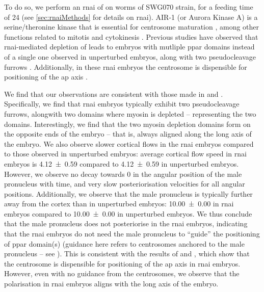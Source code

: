 To do so, we perform an \ac{rnai} of  on worms of SWG070 strain, for a feeding time of \SI{24}{\unitRNAiTime} (see \autoref{sec:rnaiMethods} for details on \ac{rnai}). AIR-1 (or Aurora Kinase A) is a serine/theronine kinase that is essential for centrosome maturation \citep{hannak2001aurora}, among other functions related to mitotis and cytokinesis \citep{kapoor2019centrosome}. Previous studies have observed that \ac{rnai}-mediated depletion of  leads to embryos with mutliple \ac{ppar} domains instead of a single one observed in unperturbed embryos, along with two pseudocleavage furrows \citep{kapoor2019centrosome,klinkert2019aurora}. Additionally, in these \ac{rnai} embryos the centrosome is dispensible for positioning of the \ac{ap} axis \citep{kapoor2019centrosome,klinkert2019aurora}. 

We find that our observations are consistent with those made in \cite{klinkert2019aurora} and \cite{kapoor2019centrosome}. Specifically, we find that  \ac{rnai} embryos typically exhibit two pseudocleavage furrows, alongwith two domains where myosin is depleted -- representing the two  domains. Interestingly, we find that the two myosin depletion domains form on the opposite ends of the embryo -- that is, always aligned along the long axis of the embryo. We also observe slower cortical flows in the \ac{rnai} embryos compared to those observed in unperturbed embryos: average cortical flow speed in \ac{rnai} embryos is \SI{4.12 +- 0.59}{\unitCrtxVel} compared to \SI{4.12 +- 0.59}{\unitCrtxVel} in unperturbed embryos. However, we observe no decay towards \SI{0}{\unitAngle} in the angular position of the male pronucleus with time, and very slow posteriorisation velocities for all angular positions. Additionally, we observe that the male pronucleus is typically further away from the cortex than in unperturbed embryos: \SI{10.00 +- 0.00}{\unitLength} in \ac{rnai} embryos compared to \SI{10.00 +- 0.00}{\unitLength} in unperturbed embryos. We thus conclude that the male pronucleus does not posteriorise in the  \ac{rnai} embryos, indicating that the \ac{rnai} embryos do not need the male pronucleus to \enquote{guide} the positioning of \ac{ppar} domain(s) (guidance here refers to centrosomes anchored to the male pronucleus -- see \cite{gross2019guiding}). This is consistent with the results of \cite{klinkert2019aurora} and \cite{kapoor2019centrosome}, which show that the centrosome is dispensible for positioning of the \ac{ap} axis in  \ac{rnai} embryos. However, even with no guidance from the centrosomes, we observe that the polarisation in  \ac{rnai} embryos aligns with the long axis of the embryo.

